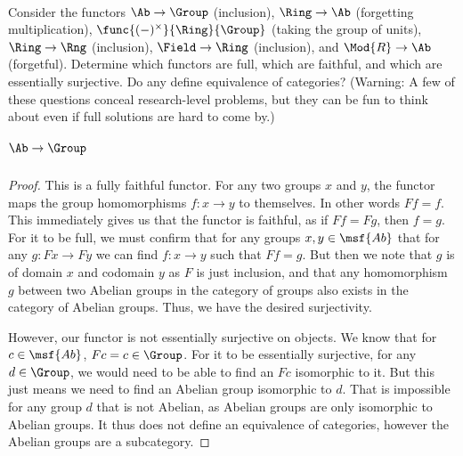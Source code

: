 \documentclass[main.tex]{subfiles}
\begin{document}
\maketitle

\paragraph{}
\begin{exercise}
	Consider the functors \(\Ab\to\Group\) (inclusion), \(\Ring\to\Ab\)
	(forgetting multiplication), \(\func{(-)^\times}{\Ring}{\Group}\) (taking
	the group of units), \(\Ring\to\Rng\) (inclusion), \(\Field\to\Ring\)
	(inclusion), and \(\Mod{R}\to\Ab\) (forgetful). Determine which functors are
	full, which are faithful, and which are essentially surjective. Do any
	define equivalence of categories? (Warning: A few of these questions conceal
	research-level problems, but they can be fun to think about even if full
	solutions are hard to come by.)
\end{exercise}

\subparagraph{\(\Ab\to\Group\)}
\begin{proof}
	This is a fully faithful functor. For any two groups $x$ and $y$, the
	functor maps the group homomorphisms $f\colon x \rightarrow y$ to
	themselves.  In other words $Ff = f$.  This immediately gives us that the
	functor is faithful, as if $Ff = Fg$, then $f = g$. For it to be full, we
	must confirm that for any groups $x,y \in \msf{Ab}$ that for any $g\colon Fx
	\rightarrow Fy$ we can find $f\colon x \rightarrow y$ such that $Ff = g$.
	But then we note that $g$ is of domain $x$ and codomain $y$ as $F$ is just
	inclusion, and that any homomorphism $g$ between two Abelian groups in the
	category of groups also exists in the category of Abelian groups.  Thus, we
	have the desired surjectivity.

	However, our functor is not essentially surjective on objects.  We know that
	for $c \in \msf{Ab}$, $Fc = c \in\Group$.  For it to be essentially
	surjective, for any $d \in \Group$, we would need to be able to find an $Fc$
	isomorphic to it. But this just means we need to find an Abelian group
	isomorphic to $d$.  That is impossible for any group $d$ that is not
	Abelian, as Abelian groups are only isomorphic to Abelian groups. It thus
	does not define an equivalence of categories, however the Abelian groups are
	a subcategory.
\end{proof}
\end{document}
